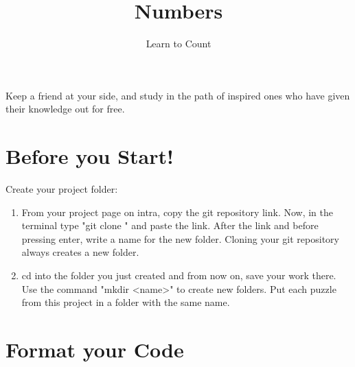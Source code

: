 \documentclass{42-en}
\begin{document}
\title{Numbers}
\subtitle{Learn to Count}


\summary
{
	Keep a friend at your side, and study in the path of inspired ones who have given their knowledge out for free. 
}

\maketitle

\tableofcontents


\chapter{Before you Start!}

Create your project folder:
	\begin{enumerate}
		\item From your project page on intra, copy the git repository link. Now, in the terminal type "git clone " and paste the link. After the link and before pressing enter, write a name for the new folder. Cloning your git repository always creates a new folder.
		\item cd into the folder you just created and from now on, save your work there. Use the command "mkdir <name>" to create new folders. Put each puzzle from this project in a folder with the same name.
	\end{enumerate}



\chapter{Format your Code}
\end{document}
